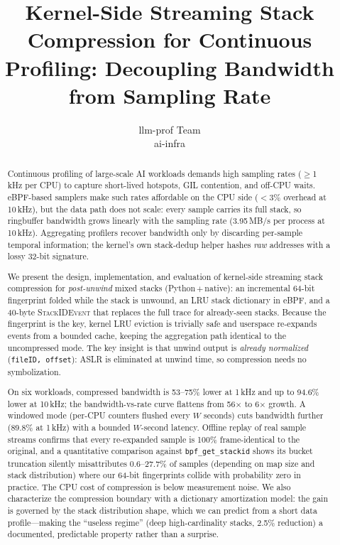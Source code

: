 \documentclass[letterpaper,twocolumn,10pt]{article}
\begin{document}
\title{\bf \Large Kernel-Side Streaming Stack Compression for Continuous
Profiling: Decoupling Bandwidth from Sampling Rate}

\author{
{\rm llm-prof Team}\\
{\rm ai-infra}
}

\maketitle

\begin{abstract}
Continuous profiling of large-scale AI workloads demands high sampling rates
($\geq$1\,kHz per CPU) to capture short-lived hotspots, GIL contention, and
off-CPU waits. eBPF-based samplers make such rates affordable on the CPU side
($<$3\% overhead at 10\,kHz), but the data path does not scale: every sample
carries its full stack, so ringbuffer bandwidth grows linearly with the
sampling rate (3.95\,MB/s per process at 10\,kHz). Aggregating profilers
recover bandwidth only by discarding per-sample temporal information; the
kernel's own stack-dedup helper hashes \emph{raw} addresses with a lossy
32-bit signature.

We present the design, implementation, and evaluation of kernel-side
streaming stack compression for \emph{post-unwind} mixed stacks
(Python\,$+$\,native): an incremental 64-bit fingerprint folded while the
stack is unwound, an LRU stack dictionary in eBPF, and a 40-byte
\textsc{StackIDEvent} that replaces the full trace for already-seen stacks.
Because the fingerprint is the key, kernel LRU eviction is trivially safe and
userspace re-expands events from a bounded cache, keeping the aggregation
path identical to the uncompressed mode. The key insight is that unwind
output is \emph{already normalized} (\texttt{fileID, offset}): ASLR is
eliminated at unwind time, so compression needs no symbolization.

On six workloads, compressed bandwidth is 53--75\% lower at 1\,kHz and
up to 94.6\% lower at 10\,kHz; the bandwidth-vs-rate curve flattens from
56$\times$ to 6$\times$ growth. A windowed mode (per-CPU counters flushed
every $W$ seconds) cuts bandwidth further (89.8\% at 1\,kHz) with a
bounded $W$-second latency. Offline replay of real sample streams confirms
that every re-expanded sample is 100\% frame-identical to the original,
and a quantitative comparison against \texttt{bpf\_get\_stackid} shows
its bucket truncation silently misattributes 0.6--27.7\% of samples
(depending on map size and stack distribution) where our 64-bit
fingerprints collide with probability zero in practice. The CPU cost of
compression is below measurement noise. We also characterize the compression boundary with a dictionary
amortization model: the gain is governed by the stack distribution shape,
which we can predict from a short data profile---making the ``useless
regime'' (deep high-cardinality stacks, 2.5\% reduction) a documented,
predictable property rather than a surprise.
\end{abstract}
\end{document}
